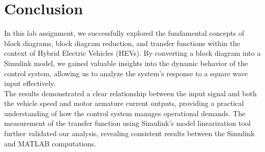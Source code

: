 \documentclass[a4paper, 12pt, english]{article}
\begin{document}
\section{Conclusion}
In this lab assignment, we successfully explored the fundamental concepts of block diagrams, block diagram reduction, and transfer functions within the context of Hybrid Electric Vehicles (HEVs). By converting a block diagram into a Simulink model, we gained valuable insights into the dynamic behavior of the control system, allowing us to analyze the system's response to a square wave input effectively. \\

The results demonstrated a clear relationship between the input signal and both the vehicle speed and motor armature current outputs, providing a practical understanding of how the control system manages operational demands. The measurement of the transfer function using Simulink's model linearization tool further validated our analysis, revealing consistent results between the Simulink and MATLAB computations.
\end{document}

